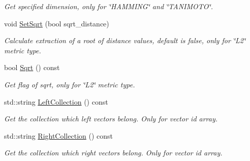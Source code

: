 \begin{DoxyCompactItemize}
\begin{DoxyCompactList}\small\item\em Get specified dimension, only for \char`\"{}\+H\+A\+M\+M\+I\+N\+G\char`\"{} and \char`\"{}\+T\+A\+N\+I\+M\+O\+T\+O\char`\"{}. \end{DoxyCompactList}\item 
\mbox{\label{classmilvus_1_1_calc_distance_arguments_a2af6d6ec052a56f8e54163e01317f904}} 
void \hyperlink{classmilvus_1_1_calc_distance_arguments_a2af6d6ec052a56f8e54163e01317f904}{Set\+Sqrt} (bool sqrt\+\_\+distance)
\begin{DoxyCompactList}\small\item\em Calculate extraction of a root of distance values, default is false, only for \char`\"{}\+L2\char`\"{} metric type. \end{DoxyCompactList}\item 
\mbox{\label{classmilvus_1_1_calc_distance_arguments_a24dacf8c988e26fae2e2df24cb8e5f03}} 
bool \hyperlink{classmilvus_1_1_calc_distance_arguments_a24dacf8c988e26fae2e2df24cb8e5f03}{Sqrt} () const
\begin{DoxyCompactList}\small\item\em Get flag of sqrt, only for \char`\"{}\+L2\char`\"{} metric type. \end{DoxyCompactList}\item 
\mbox{\label{classmilvus_1_1_calc_distance_arguments_a28e1b2f9d2650ae3ddd78206c91f955c}} 
std\+::string \hyperlink{classmilvus_1_1_calc_distance_arguments_a28e1b2f9d2650ae3ddd78206c91f955c}{Left\+Collection} () const
\begin{DoxyCompactList}\small\item\em Get the collection which left vectors belong. Only for vector id array. \end{DoxyCompactList}\item 
\mbox{\label{classmilvus_1_1_calc_distance_arguments_a5e8d67c5973be79e2f01eecedead8813}} 
std\+::string \hyperlink{classmilvus_1_1_calc_distance_arguments_a5e8d67c5973be79e2f01eecedead8813}{Right\+Collection} () const
\begin{DoxyCompactList}\small\item\em Get the collection which right vectors belong. Only for vector id array. \end{DoxyCompactList}\item 

\end{DoxyCompactItemize}
